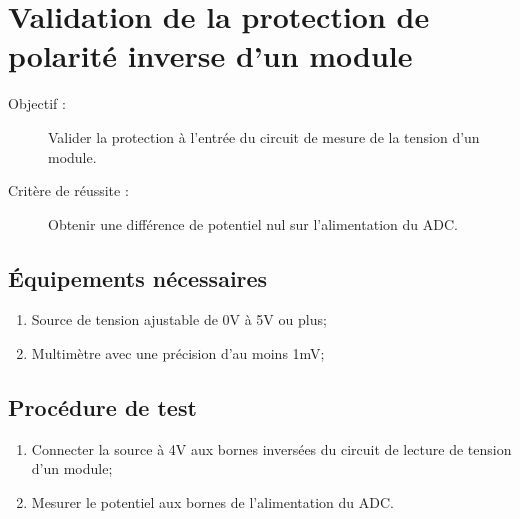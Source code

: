 
\section{Validation de la protection de polarité inverse d'un module}

	\begin{description}
		\item[Objectif :] Valider la protection à l'entrée du circuit de mesure de la tension d'un module.
		\item[Critère de réussite :] Obtenir une différence de potentiel nul sur l'alimentation du ADC.
	\end{description}
	
	\subsection*{Équipements nécessaires}
	\begin{enumerate}
		\item Source de tension ajustable de 0V à 5V ou plus;
		\item Multimètre avec une précision d'au moins 1mV;
	\end{enumerate}	
	
	\subsection*{Procédure de test}
	\begin{enumerate}
		\item Connecter la source à 4V aux bornes inversées du circuit de lecture de tension d'un module;
		\item Mesurer le potentiel aux bornes de l'alimentation du ADC.
	\end{enumerate}